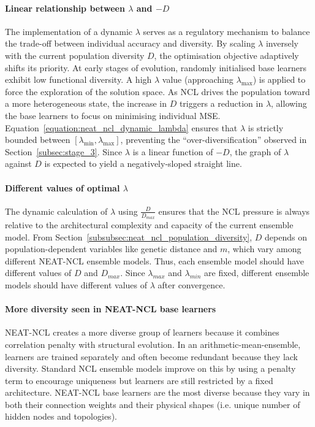 \paragraph{Linear relationship between $\lambda$ and $-D$}
The implementation of a dynamic $\lambda$ serves as a regulatory mechanism to balance the trade-off between individual accuracy and diversity. By scaling $\lambda$ inversely with the current population diversity $D$, the optimisation objective adaptively shifts its priority. At early stages of evolution, randomly initialised base learners exhibit low functional diversity. A high $\lambda$ value (approaching $\lambda_{\max}$) is applied to force the exploration of the solution space. As NCL drives the population toward a more heterogeneous state, the increase in $D$ triggers a reduction in $\lambda$, allowing the base learners to focus on minimising individual MSE. Equation~\ref{equation:neat_ncl_dynamic_lambda} ensures that $\lambda$ is strictly bounded between $[\lambda_{\min}, \lambda_{\max}]$, preventing the ``over-diversification'' observed in Section~\ref{subsec:stage_3}. Since $\lambda$ is a linear function of $-D$, the graph of $\lambda$ against $D$ is expected to yield a negatively-sloped straight line. 

\paragraph{Different values of optimal $\lambda$}
The dynamic calculation of $\lambda$ using $\frac{D}{D_{max}}$ ensures that the NCL pressure is always relative to the architectural complexity and capacity of the current ensemble model. From Section~\ref{subsubsec:neat_ncl_population_diversity}, $D$ depends on population-dependent variables like genetic distance and $m$, which vary among different NEAT-NCL ensemble models. Thus, each ensemble model should have different values of $D$ and $D_{max}$. Since $\lambda_{max}$ and $\lambda_{min}$ are fixed, different ensemble models should have different values of $\lambda$ after convergence. 

\paragraph{More diversity seen in NEAT-NCL base learners}
NEAT-NCL creates a more diverse group of learners because it combines correlation penalty with structural evolution. In an arithmetic-mean-ensemble, learners are trained separately and often become redundant because they lack diversity. Standard NCL ensemble models improve on this by using a penalty term to encourage uniqueness but learners are still restricted by a fixed architecture. NEAT-NCL base learners are the most diverse because they vary in both their connection weights and their physical shapes (i.e. unique number of hidden nodes and topologies). 


